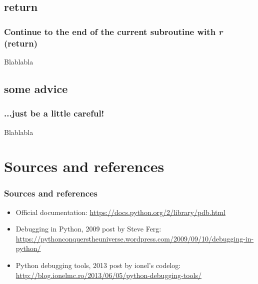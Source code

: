 \subsection{return}
\begin{frame}
\frametitle{Continue to the end of the current subroutine with \textit{\textbf{r}} (return)}
Blablabla
\end{frame}

\subsection{some advice}
\begin{frame}
\frametitle{...just be a little careful!}
Blablabla
\end{frame}






\section{Sources and references}
\begin{frame}
\frametitle{Sources and references}	
\begin{itemize}
    \item Official documentation: \url{https://docs.python.org/2/library/pdb.html}
    \item Debugging in Python, 2009 post by Steve Ferg: \url{https://pythonconquerstheuniverse.wordpress.com/2009/09/10/debugging-in-python/}
    \item Python debugging tools, 2013 post by ionel's codelog: \url{http://blog.ionelmc.ro/2013/06/05/python-debugging-tools/}
\end{itemize}
\end{frame}





